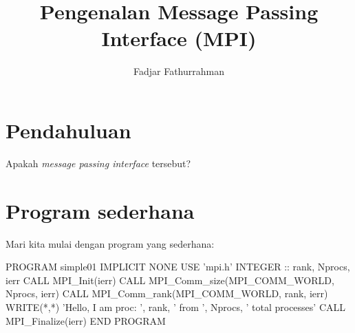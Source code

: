 \documentclass[bahasa,a4paper,12pt]{extarticle}
\begin{document}
\title{Pengenalan Message Passing Interface (MPI)}
\author{Fadjar Fathurrahman}
\maketitle

\section{Pendahuluan}

Apakah \textit{message passing interface} tersebut?


\section{Program sederhana}

Mari kita mulai dengan program yang sederhana:
\begin{fortrancode}
PROGRAM simple01
  IMPLICIT NONE
  USE 'mpi.h'
  INTEGER :: rank, Nprocs, ierr
  CALL MPI_Init(ierr)
  CALL MPI_Comm_size(MPI_COMM_WORLD, Nprocs, ierr)
  CALL MPI_Comm_rank(MPI_COMM_WORLD, rank, ierr)
  WRITE(*,*) 'Hello, I am proc: ', rank, ' from ', Nprocs, ' total processes'
  CALL MPI_Finalize(ierr)
END PROGRAM
\end{fortrancode}
\end{document}
